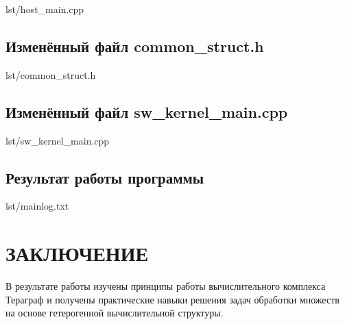 \documentclass[a4paper,oneside,14pt]{extarticle}
\begin{document}
\begin{lstinputlisting}[
        label={lst:1},
        caption={}
    ]{lst/host_main.cpp}
\end{lstinputlisting}

\subsection{Изменённый файл common\_struct.h}

\begin{lstinputlisting}[
        label={lst:1},
        caption={}
    ]{lst/common_struct.h}
\end{lstinputlisting}

\subsection{Изменённый файл sw\_kernel\_main.cpp}

\begin{lstinputlisting}[
        label={lst:1},
        caption={}
    ]{lst/sw_kernel_main.cpp}
\end{lstinputlisting}

\subsection{Результат работы программы}

\begin{lstinputlisting}[
        label={lst:1},
        caption={}
    ]{lst/mainlog.txt}
\end{lstinputlisting}


\section*{ЗАКЛЮЧЕНИЕ}

В результате работы изучены принципы работы вычислительного комплекса Тераграф и получены практические навыки решения задач обработки множеств на основе гетерогенной вычислительной структуры. 
\end{document}
